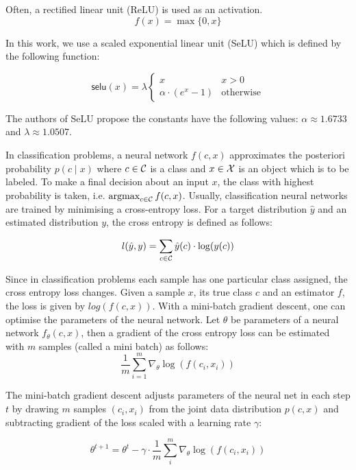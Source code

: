 Often, a rectified linear unit (ReLU) \cite{relu} is used as an activation.
\begin{equation}
    f(x) = \max\{0, x\}
\end{equation}

In this work, we use a scaled exponential linear unit (SeLU) \cite{selu} which is defined by the following function:

\begin{equation}\label{eq:selu}
    \textsf{selu}(x) = \lambda
    \begin{cases}
        x & x > 0 \\
        \alpha \cdot (e^{x} - 1) & \text{otherwise}
    \end{cases}
\end{equation}

The authors of SeLU \cite{selu} propose the constants have the following values: $\alpha \approx 1.6733$ and $\lambda \approx 1.0507$.

In classification problems, a neural network $f(c, x)$ approximates the posteriori probability $p(c \mid x)$ where $c \in \mathcal{C}$ is a class and $x \in \mathcal{X}$ is an object which is to be labeled. To make a final decision about an input $x$, the class with highest probability is taken, i.e. $\mathop{\text{argmax}}_{c \in \mathcal{C}} f(c, x)$. Usually, classification neural networks are trained by minimising a cross-entropy loss. For a target distribution $\hat{y}$ and an estimated distribution $y$, the cross entropy is defined as follows:

\begin{equation}
    l(\hat{y}, y) = \sum_{c \in \mathcal{C}} \hat{y}(c) \cdot \log(y(c))
\end{equation}

Since in classification problems each sample has one particular class assigned, the cross entropy loss changes. Given a sample $x$, its true class $c$ and an estimator $f$, the loss is given by $log(f(c,x))$. With a mini-batch gradient descent, one can optimise the parameters of the neural network. Let $\theta$ be parameters of a neural network $f_\theta(c, x)$, then a gradient of the cross entropy loss can be estimated with $m$ samples (called a mini batch) as follows:
\begin{equation}
    \frac{1}{m} \sum_{i=1}^m \nabla_\theta \log(f(c_i, x_i))
\end{equation}

The mini-batch gradient descent adjusts parameters of the neural net in each step $t$ by drawing $m$ samples ${(c_i, x_i)}$ from the joint data  distribution $p(c, x)$ and subtracting gradient of the loss scaled with a learning rate $\gamma$:

\begin{equation}
    \theta^{t+1} = \theta^{t} - \gamma \cdot \frac{1}{m} \sum_i^m \nabla_\theta \log(f(c_i, x_i))
\end{equation}
